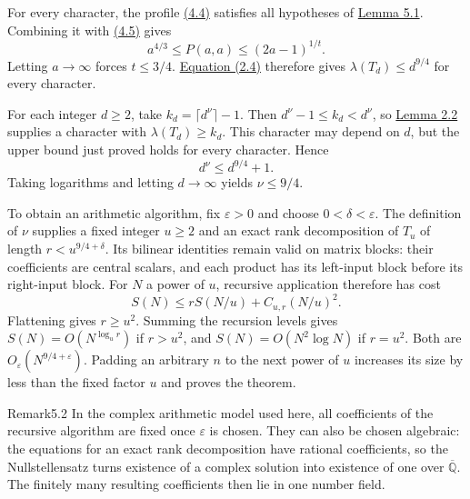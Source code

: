 \begin{amsthmproof}
For every character, the profile \hyperlink{p107.eq.4.4}{(4.4)} satisfies all hypotheses of \hyperlink{p107.result.5.1}{Lemma 5.1}. Combining it with \hyperlink{p107.eq.4.5}{(4.5)} gives
\[
a^{4/3}\le P(a,a)\le(2a-1)^{1/t}.
\]
Letting $a\to\infty$ forces $t\le3/4$. \hyperlink{p107.eq.2.4}{Equation (2.4)} therefore gives $\lambda(T_d)\le d^{9/4}$ for every character.

For each integer $d\ge2$, take $k_d=\lceil d^\nu\rceil-1$. Then $d^\nu-1\le k_d<d^\nu$, so \hyperlink{p107.result.2.2}{Lemma 2.2} supplies a character with $\lambda(T_d)\ge k_d$. This character may depend on $d$, but the upper bound just proved holds for every character. Hence
\[
d^\nu\le d^{9/4}+1.
\]
Taking logarithms and letting $d\to\infty$ yields $\nu\le9/4$.

To obtain an arithmetic algorithm, fix $\varepsilon>0$ and choose $0<\delta<\varepsilon$. The definition of $\nu$ supplies a fixed integer $u\ge2$ and an exact rank decomposition of $T_u$ of length $r<u^{9/4+\delta}$. Its bilinear identities remain valid on matrix blocks: their coefficients are central scalars, and each product has its left-input block before its right-input block. For $N$ a power of $u$, recursive application therefore has cost
\[
S(N)\le rS(N/u)+C_{u,r}(N/u)^2.
\]
Flattening gives $r\ge u^2$. Summing the recursion levels gives $S(N)=O(N^{\log_u r})$ if $r>u^2$, and $S(N)=O(N^2\log N)$ if $r=u^2$. Both are $O_\varepsilon(N^{9/4+\varepsilon})$. Padding an arbitrary $n$ to the next power of $u$ increases its size by less than the fixed factor $u$ and proves the theorem.
\end{amsthmproof}

\begin{result}{Remark}{5.2}{}
In the complex arithmetic model used here, all coefficients of the recursive algorithm are fixed once $\varepsilon$ is chosen. They can also be chosen algebraic: the equations for an exact rank decomposition have rational coefficients, so the Nullstellensatz turns existence of a complex solution into existence of one over $\overline{\mathbb Q}$. The finitely many resulting coefficients then lie in one number field.
\end{result}
